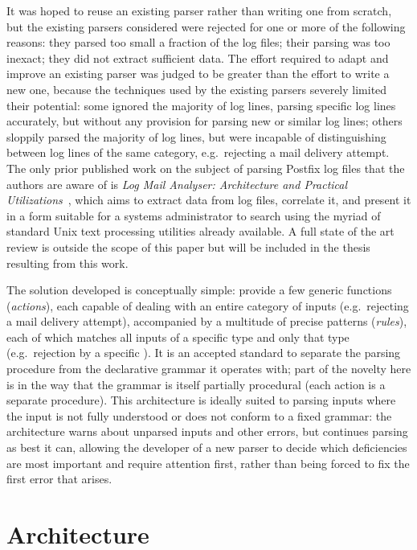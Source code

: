 \documentclass[preprint,draft,numbers]{elsarticle}
\begin{document}
It was hoped to reuse an existing parser rather than writing one from
scratch, but the existing parsers considered were rejected for one or more
of the following reasons: they parsed too small a fraction of the log
files; their parsing was too inexact; they did not extract sufficient data.
The effort required to adapt and improve an existing parser was judged to
be greater than the effort to write a new one, because the techniques used
by the existing parsers severely limited their potential: some ignored the
majority of log lines, parsing specific log lines accurately, but without
any provision for parsing new or similar log lines; others sloppily parsed
the majority of log lines, but were incapable of distinguishing between log
lines of the same category, e.g.\ rejecting a mail delivery attempt.  The only prior published
work on the subject of parsing Postfix log files that the authors are aware
of is \textit{Log Mail Analyser: Architecture and Practical
Utilizations\/}~\cite{log-mail-analyser}, which aims to extract data from
log files, correlate it, and present it in a form suitable for a systems
administrator to search using the myriad of standard Unix text processing
utilities already available.  A full state of the art review is outside the
scope of this paper but will be included in the thesis resulting from this
work.

The solution developed is conceptually simple: provide a few generic
functions (\textit{actions\/}), each capable of dealing with an entire
category of inputs (e.g.\ rejecting a mail delivery attempt), accompanied
by a multitude of precise patterns (\textit{rules\/}), each of which
matches all inputs of a specific type and only that type (e.g.\ rejection
by a specific \DNSBL{}).  It is an accepted standard to separate the
parsing procedure from the declarative grammar it operates with; part of
the novelty here is in the way that the grammar is itself partially
procedural (each action is a separate procedure).  This architecture is
ideally suited to parsing inputs where the input is not fully understood or
does not conform to a fixed grammar: the architecture warns about unparsed
inputs and other errors, but continues parsing as best it can, allowing the
developer of a new parser to decide which deficiencies are most important
and require attention first, rather than being forced to fix the first
error that arises.

\section{Architecture}
\end{document}
